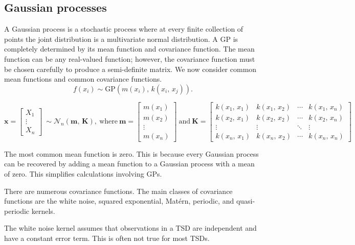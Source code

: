 \subsection{Gaussian processes}

A Gaussian process is a stochastic process where at every finite collection of points the joint distribution is a multivariate normal distribution. A GP is completely determined by its mean function and covariance function. The mean function can be any real-valued function; however, the covariance function must be chosen carefully to produce a semi-definite matrix. We now consider common mean functions and common covariance functions.
\[f(x_{i}) \sim \text{GP}(m(x_{i}), \, k(x_{i},\, x_{j})).\]

\(\mathbf{x} =
\begin{bmatrix}
   X_{1} \\
   \vdots \\
   X_{n}
\end{bmatrix}
\:
\sim \mathcal{N}_{n}(\mathbf{m}, \, \mathbf{K}),
\:
\text{where}
\:
\mathbf{m} = 
\begin{bmatrix}
   m(x_{1}) \\
   m(x_{2}) \\
   \vdots \\
   m(x_{n})
\end{bmatrix}  
\: 
\text{and}
\:
\mathbf{K} = 
\begin{bmatrix}
   k(x_{1}, \, x_{1}) & k(x_{1}, \, x_{2}) & \cdots & k(x_{1}, \, x_{n}) \\
   k(x_{2}, \, x_{1}) & k(x_{2}, \, x_{2}) & \cdots & k(x_{2}, \, x_{n}) \\
   \vdots & \vdots & \ddots & \vdots \\
   k(x_{n}, \, x_{1}) & k(x_{n}, \, x_{2}) & \cdots & k(x_{n}, \, x_{n})
\end{bmatrix}\)

The most common mean function is zero. This is because every Gaussian process can be recovered by adding a mean function to a Gaussian process with a mean of zero. This simplifies calculations involving GPs. 

There are numerous covariance functions. The main classes of covariance functions are the white noise, squared exponential, Mat\'ern, periodic, and quasi-periodic kernels.

The white noise kernel assumes that observations in a TSD are independent and have a constant error term. This is often not true for most TSDs.

